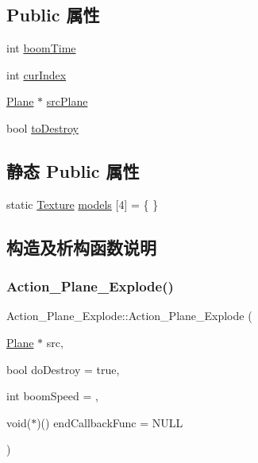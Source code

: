 \subsection*{Public 属性}
\begin{DoxyCompactItemize}
\item 
int \hyperlink{class_action___plane___explode_a3425e9988fc97a794c01b3288df4afe6}{boom\+Time}
\item 
int \hyperlink{class_action___plane___explode_a5da7d39e28db0b1a852ae81cc6e96ba5}{cur\+Index}
\item 
\hyperlink{class_plane}{Plane} $\ast$ \hyperlink{class_action___plane___explode_a98d4991b3266a6c7fc5ebbad4d41f136}{src\+Plane}
\item 
bool \hyperlink{class_action___plane___explode_a655f5cf52656c4ce16040d2310494029}{to\+Destroy}
\end{DoxyCompactItemize}
\subsection*{静态 Public 属性}
\begin{DoxyCompactItemize}
\item 
static \hyperlink{struct_texture}{Texture} \hyperlink{class_action___plane___explode_ab37c2419e1e16a739b856de09df79909}{models} \mbox{[}4\mbox{]} = \{ \}
\end{DoxyCompactItemize}


\subsection{构造及析构函数说明}
\mbox{\label{class_action___plane___explode_aa7aeb998cd636ad6d0b42d9e23a43b57}} 
\subsubsection{\texorpdfstring{Action\+\_\+\+Plane\+\_\+\+Explode()}{Action\_Plane\_Explode()}}
{\footnotesize\ttfamily Action\+\_\+\+Plane\+\_\+\+Explode\+::\+Action\+\_\+\+Plane\+\_\+\+Explode (\begin{DoxyParamCaption}\item[{\hyperlink{class_plane}{Plane} $\ast$}]{src,  }\item[{bool}]{do\+Destroy = {\ttfamily true},  }\item[{int}]{boom\+Speed = {},  }\item[{void($\ast$)()}]{end\+Callback\+Func = {\ttfamily NULL} }\end{DoxyParamCaption})}

